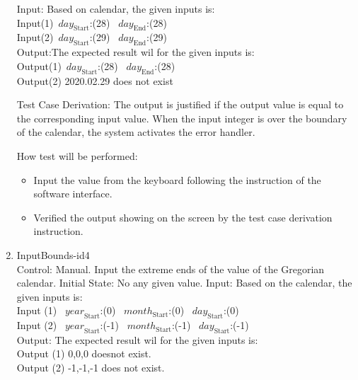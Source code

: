 \documentclass[12pt, titlepage]{article}
\begin{document}
\begin{enumerate}
Input: Based on calendar, the given inputs is:\\ 
Input(1)~$\mathit{day}_\text{Start}$:(28) 
~$\mathit{day}_\text{End}$:(28)\\ 
Input(2)~$\mathit{day}_\text{Start}$:(29) 
~$\mathit{day}_\text{End}$:(29)\\ 

Output:The expected result wil for the given inputs is:\\
 Output(1)~$\mathit{day}_\text{Start}$:(28)
 ~$\mathit{day}_\text{End}$:(28)\\
 Output(2) 2020.02.29 does not exist\\ 


Test Case Derivation: The output is justified if the output value is equal to
the corresponding input value. When the input integer is over the boundary of
the calendar, the system activates the error handler. \\


How test will be performed:
\begin{itemize} 
\item Input the value from the keyboard following the instruction of the
software interface. 
\item Verified the output showing on the screen by the test case derivation
 instruction. 
\end{itemize}

\item{InputBounds-id4\\}
Control: Manual. Input the extreme ends of the value of the Gregorian 
calendar. 
Initial State: No any given value.
Input: Based on the calendar, the given inputs is:\\ 
Input (1)
~$\mathit{year}_\text{Start}$:(0) ~$\mathit{month}_\text{Start}$:(0)
~$\mathit{day}_\text{Start}$:(0)\\ 
Input (2) ~$\mathit{year}_\text{Start}$:(-1)
~$\mathit{month}_\text{Start}$:(-1) ~$\mathit{day}_\text{Start}$:(-1)\\

Output: The expected result wil for the given inputs is:\\ 
Output (1) 0,0,0 doesnot exist.\\ 
Output (2) -1,-1,-1 does not exist.



\end{enumerate}
\end{document}
